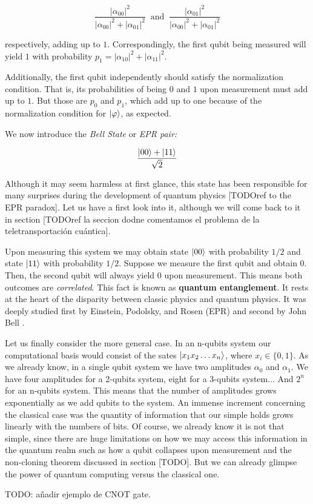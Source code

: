$$ \frac{ |\alpha_{00}|^2 }{ |\alpha_{00}|^2 + |\alpha_{01}|^2 }  \ \text{ and } \ 
\frac{ |\alpha_{01}|^2 }{ |\alpha_{00}|^2 + |\alpha_{01}|^2 } $$

respectively, adding up to $1$. Correspondingly, the first qubit being measured will yield $1$ with probability $p_1 = |\alpha_{10}|^2 + |\alpha_{11}|^2$.

Additionally, the first qubit independently should satisfy the normalization condition. That is, its probabilities of being $0$ and $1$ upon measurement must add up to $1$. But those are $p_0$ and $p_1$, which add up to one because of the normalization condition for $|\varphi\rangle$, as expected.

We now introduce the \emph{Bell State} or \emph{EPR pair:}

$$ \frac{ |00\rangle + |11\rangle }{ \sqrt 2 } $$

Although it may seem harmless at first glance, this state has been responsible for many surprises during the development of quantum physics [TODOref to the EPR paradox]. Let us have a first look into it, although we will come back to it in section [TODOref la seccion dodne comentamos el problema de la teletransportación cuántica].

Upon measuring this system we may obtain state $|00\rangle$ with probability $1/2$ and state $|11\rangle$ with probability $1/2$. Suppose we measure the first qubit and obtain $0$. Then, the second qubit will always yield $0$ upon measurement. This means both outcomes are \emph{correlated}. This fact is known as \textbf{quantum entanglement}. It rests at the heart of the disparity between classic physics and quantum physics. It was deeply studied first by Einstein, Podolsky, and Rosen (EPR) \cite{Einstein1935} and second by John Bell \cite{Bellt1964}.

Let us finally consider the more general case. In an n-qubits system our computational basis would consist of the sates $|x_1 x_2 \dotsc x_n\rangle$, where $x_i \in \{0,1\}$. As we already know, in a single qubit system we have two amplitudes $\alpha_0$ and $\alpha_1$. We have four amplitudes for a 2-qubits system, eight for a 3-qubits system... And $2^n$ for an n-qubits system. This means that the number of amplitudes grows exponentially as we add qubits to the system. An immense increment concerning the classical case was the quantity of information that our simple holds grows linearly with the numbers of bits. Of course, we already know it is not that simple, since there are huge limitations on how we may access this information in the quantum realm such as how a qubit collapses upon measurement and the non-cloning theorem discussed in section [TODO]. But we can already glimpse the power of quantum computing versus the classical one.


TODO: añadir ejemplo de CNOT gate.
